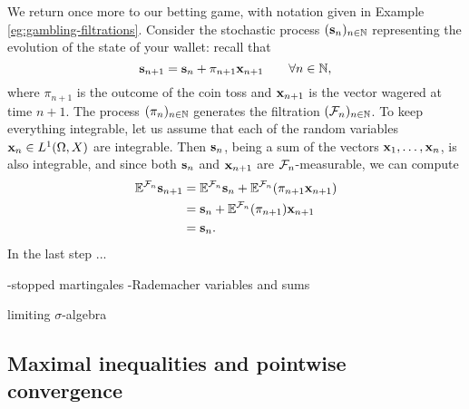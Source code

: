 \begin{example}
  We return once more to our betting game, with notation given in Example \ref{eg:gambling-filtrations}.
  Consider the stochastic process $(\mathbf{s}_n)_{n \in \mathbb{N}}$ representing the evolution of the state of your wallet: recall that
  \begin{equation*}
    \mathbf{s}_{n+1} = \mathbf{s}_n + \pi_{n+1} \mathbf{x}_{n+1} \qquad \forall n \in \mathbb{N},
  \end{equation*}
  where $\pi_{n+1}$ is the outcome of the coin toss and $\mathbf{x}_{n+1}$ is the vector wagered at time $n+1$.
  The process $(\pi_n)_{n \in \mathbb{N}}$ generates the filtration $(\mathcal{F}_n)_{n \in \mathbb{N}}$.
  To keep everything integrable, let us assume that each of the random variables $\mathbf{x}_n \in L^1(\Omega,X)$ are integrable.
  Then $\mathbf{s}_n$, being a sum of the vectors $\mathbf{x}_1, \ldots, \mathbf{x}_n$, is also integrable, and since both $\mathbf{s}_n$ and $\mathbf{x}_{n+1}$ are $\mathcal{F}_n$-measurable, we can compute
  \begin{equation*}
    \begin{aligned}
      \mathbb{E}^{\mathcal{F}_n} \mathbf{s}_{n+1} &= \mathbb{E}^{\mathcal{F}_n} \mathbf{s}_n + \mathbb{E}^{\mathcal{F}_n}( \pi_{n+1} \mathbf{x}_{n+1} ) \\
      &= \mathbf{s}_n + \mathbb{E}^{\mathcal{F}_n}(\pi_{n+1}) \mathbf{x}_{n+1} \\
      &= \mathbf{s}_n.
    \end{aligned}
  \end{equation*}
  In the last step ...
\end{example}

-stopped martingales
-Rademacher variables and sums


\begin{defn}
  limiting $\sigma$-algebra 
\end{defn}

\begin{thm}
  
\end{thm}

\subsection{Maximal inequalities and pointwise convergence}


